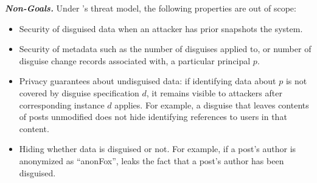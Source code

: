 \vspace{6pt}\noindent\textbf{\emph{Non-Goals.}}
%
Under \sys's threat model, the following properties are out of scope:
%
\begin{itemize}
    \item Security of disguised data when an attacker has prior snapshots the system.
    \item Security of metadata such as the number of disguises applied to, or number of
	disguise change records associated with, a particular principal $p$.
    \item Privacy guarantees about undisguised data: if identifying data about $p$ is not covered by
        disguise specification $d$, it remains visible to attackers after corresponding instance $d$ applies.
        For example, a disguise that leaves contents of posts unmodified does not hide identifying references
	to users in that content.
    \item Hiding whether data is disguised or not. For example, if a post's author is anonymized as ``anonFox'',
        \sys leaks the fact that a post's author has been disguised.
\end{itemize}

